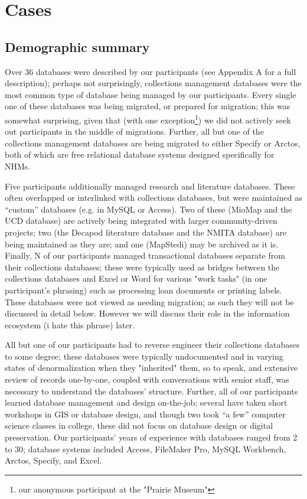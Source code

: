 \section{Cases}

\subsection{Demographic summary}

Over 36 databases were described by our participants (see Appendix A for a full description); perhaps not surprisingly, collections management databases were the most common type of database being managed by our participants. Every single one of these databases was being migrated, or prepared for migration; this was somewhat surprising, given that (with one exception\footnote{our anonymous participant at the "Prairie Museum"}) we did not actively seek out participants in the middle of migrations. Further, all but one of the collections management databases are being migrated to either Specify or Arctos, both of which are free relational database systems designed specifically for NHMs. 

Five participants additionally managed research and literature databases. These often overlapped or interlinked with collections databases, but were maintained as “custom” databases (e.g. in MySQL or Access). Two of these (MioMap and the UCD database) are actively being integrated with larger community-driven projects; two (the Decapod literature database and the NMITA database) are being maintained as they are; and one (MapStedi) may be archived as it is.  Finally, N of our participants managed transactional databases separate from their collections databases; these were typically used as bridges between the collections databases and Excel or Word for various "work tasks" (in one participant's phrasing) such as processing loan documents or printing labels. These databases were not viewed as needing migration; as such they will not be discussed in detail below.  However we will discuss their role in the information ecosystem (i hate this phrase) later.

All but one of our participants had to reverse engineer their collections databases to some degree; these databases were typically undocumented and in varying states of denormalization when they "inherited" them, so to speak, and extensive review of records one-by-one, coupled with conversations with senior staff, was necessary to understand the databases' structure. Further, all of our participants learned database management and design on-the-job; several have taken short workshops in GIS or database design, and though two took “a few” computer science classes in college, these did not focus on database design or digital preservation. Our participants’ years of experience with databases ranged from 2 to 30; database systems included Access, FileMaker Pro, MySQL Workbench, Arctos, Specify, and Excel. 

